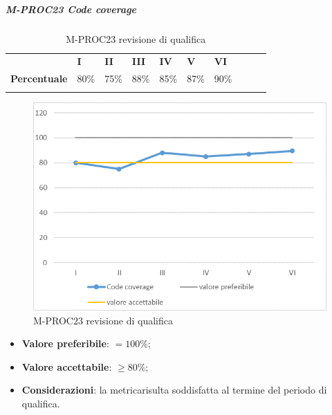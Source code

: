 \subparagraph{M-PROC23 Code coverage} \mbox{}
\begin{longtable}[H!] {						
		>{}p{50mm}  		
		>{}p{8mm}
		>{}p{8mm}		
		>{}p{8mm}		
		>{}p{8mm}		
		>{}p{8mm}		
		>{}p{8mm}
		>{}p{8mm}
		>{}p{8mm}
		>{}p{8mm}
	}
	\rowcolor{gray!50}
	\textbf{} & \textbf{I} & \textbf{II} & \textbf{III} & \textbf{IV} & \textbf{V} & \textbf{VI} \TBstrut \\ [2mm]
	\textbf{Percentuale} & 80\% & 75\% & 88\% & 85\% & 87\% & 90\% \TBstrut \\ [2mm]
	\rowcolor{white}
	\caption{M-PROC23 revisione di qualifica}
\end{longtable}
\begin{figure}[H] 	
	\includegraphics[width=\linewidth]{./img/grafici/RQ23.png}	
	\caption{M-PROC23 revisione di qualifica}	
\end{figure}
\begin{itemize}
	\item \textbf{Valore preferibile}: $=100\%$;
	\item \textbf{Valore accettabile}: $\ge 80\%$;
	\item \textbf{Considerazioni}: la metrica\glosp risulta soddisfatta al termine del periodo di qualifica.
\end{itemize}

